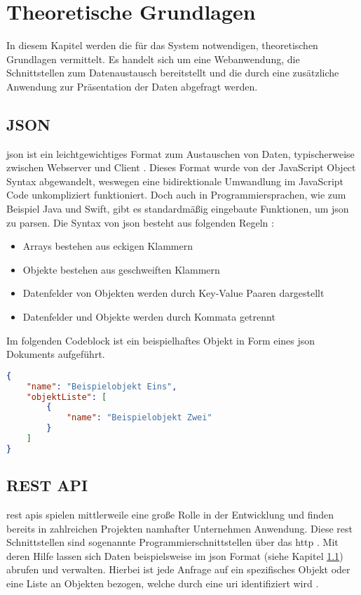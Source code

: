 \chapter{Theoretische Grundlagen}
In diesem Kapitel werden die für das System notwendigen, theoretischen Grundlagen vermittelt.
Es handelt sich um eine Webanwendung, die Schnittstellen zum Datenaustausch bereitstellt und die durch eine zusätzliche Anwendung zur Präsentation der Daten abgefragt werden.

\section{JSON} \label{json}
\gls{json} ist ein leichtgewichtiges Format zum Austauschen von Daten, typischerweise zwischen Webserver und Client \cite[S.~23]{client-server-book}.
Dieses Format wurde von der JavaScript Object Syntax abgewandelt, weswegen eine bidirektionale Umwandlung im JavaScript Code unkompliziert funktioniert.
Doch auch in Programmiersprachen, wie zum Beispiel Java und Swift, gibt es standardmäßig eingebaute Funktionen, um \gls{json} zu parsen.
Die Syntax von \gls{json} besteht aus folgenden Regeln \cite[S.~23]{client-server-book}:

\begin{itemize}
	\item Arrays bestehen aus eckigen Klammern
	\item Objekte bestehen aus geschweiften Klammern
	\item Datenfelder von Objekten werden durch Key-Value Paaren dargestellt
	\item Datenfelder und Objekte werden durch Kommata getrennt
\end{itemize}

Im folgenden Codeblock ist ein beispielhaftes Objekt in Form eines \gls{json} Dokuments aufgeführt.
\begin{lstlisting}[language=Json]
{
	"name": "Beispielobjekt Eins",
	"objektListe": [
		{
			"name": "Beispielobjekt Zwei"
		}
	]
}
\end{lstlisting}

\clearpage

\section{REST API} \label{rest}
\gls{rest} \glspl{api} spielen mittlerweile eine große Rolle in der Entwicklung und finden bereits in zahlreichen Projekten namhafter Unternehmen Anwendung. Diese \gls{rest} Schnittstellen sind sogenannte Programmierschnittstellen über das \gls{http} \cite[S.~259]{client-server-book}. Mit deren Hilfe lassen sich Daten beispielsweise im \gls{json} Format (siehe Kapitel \ref{json}) abrufen und verwalten.
Hierbei ist jede Anfrage auf ein spezifisches Objekt oder eine Liste an Objekten bezogen, welche durch eine \gls{uri} identifiziert wird \cite[S.~259]{client-server-book}.

